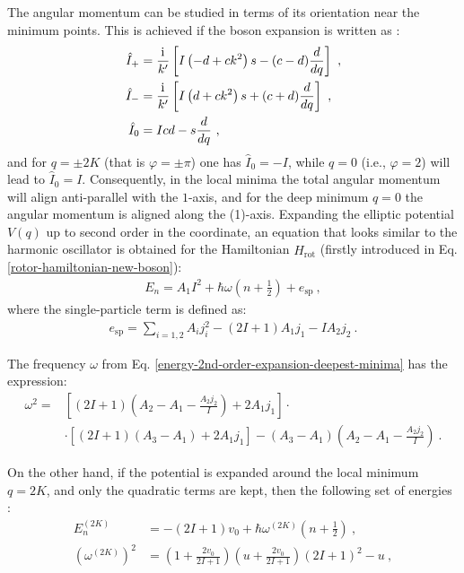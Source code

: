 The angular momentum can be studied in terms of its orientation near the minimum points. This is achieved if the boson expansion is written as \cite{raduta2020new}:
\begin{align}
    \hat{I}_+&=\frac{\iu}{k'}\left[I\left(-d+ck^2\right)s-(c-d)\frac{d}{dq}\right]\ ,\nonumber\\
    \hat{I}_-&=\frac{\iu}{k'}\left[I\left(d+ck^2\right)s+(c+d)\frac{d}{dq}\right]\ ,\nonumber\\
    \hat{I}_0&=Icd-s\frac{d}{dq}\ ,
\end{align}
and for $q=\pm2K$ (that is $\varphi=\pm\pi$) one has $\hat{I}_0=-I$, while $q=0$ (i.e., $\varphi=2$) will lead to $\hat{I}_0=I$. Consequently, in the local minima the total angular momentum will align anti-parallel with the $1$-axis, and for the deep minimum $q=0$ the angular momentum is aligned along the (1)-axis. Expanding the elliptic potential $V(q)$ up to second order in the coordinate, an equation that looks similar to the harmonic oscillator is obtained for the Hamiltonian $\hat{H}_\text{rot}$ (firstly introduced in Eq. \ref{rotor-hamiltonian-new-boson}):
\begin{align}
    E_n=A_1I^2+\hbar\omega\left(n+\frac{1}{2}\right)+e_\text{sp}\ ,
    \label{energy-2nd-order-expansion-deepest-minima}
\end{align}
where the single-particle term is defined as:
\begin{align}
    e_\text{sp}=\sum_{i=1,2}A_ij_i^2-(2I+1)A_1j_1-IA_2j_2\ .
\end{align}

The frequency $\omega$ from Eq. \ref{energy-2nd-order-expansion-deepest-minima} has the expression:
\begin{align}
    \omega^2=&\left[(2I+1)\left(A_2-A_1-\frac{A_2j_2}{I}\right)+2A_1j_1\right]\cdot\nonumber\\
                &\cdot\left[(2I+1)(A_3-A_1)+2A_1j_1\right]-(A_3-A_1)\left(A_2-A_1-\frac{A_2j_2}{I}\right)\ .
    \label{omega-frequency-deepest-minima}
\end{align}

On the other hand, if the potential is expanded around the local minimum $q=2K$, and only the quadratic terms are kept, then the following set of energies :
\begin{align}
    E_n^{(2K)}&=-(2I+1)v_0+\hbar\omega^{(2K)}\left(n+\frac{1}{2}\right)\ ,\nonumber\\
    \left(\omega^{(2K)}\right)^2&=\left(1+\frac{2v_0}{2I+1}\right)\left(u+\frac{2v_0}{2I+1}\right)(2I+1)^2-u\ ,
\end{align}

